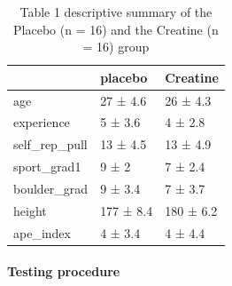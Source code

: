 \documentclass[
]{article}
\begin{document}
\begin{table}

\caption{\label{tab:unnamed-chunk-3}Table 1 descriptive summary of the Placebo (n = 16) and the Creatine (n = 16) group}
\centering
\begin{tabular}[t]{l|l|l}
\hline
  & placebo & Creatine\\
\hline
age & 27 ± 4.6 & 26 ± 4.3\\
\hline
experience & 5 ± 3.6 & 4 ± 2.8\\
\hline
self\_rep\_pull & 13 ± 4.5 & 13 ± 4.9\\
\hline
sport\_grad1 & 9 ± 2 & 7 ± 2.4\\
\hline
boulder\_grad & 9 ± 3.4 & 7 ± 3.7\\
\hline
height & 177 ± 8.4 & 180 ± 6.2\\
\hline
ape\_index & 4 ± 3.4 & 4 ± 4.4\\
\hline
\end{tabular}
\end{table}

\hypertarget{testing-procedure}{%
\paragraph{\texorpdfstring{\textbf{Testing
procedure}}{Testing procedure}}\label{testing-procedure}}
\end{document}
